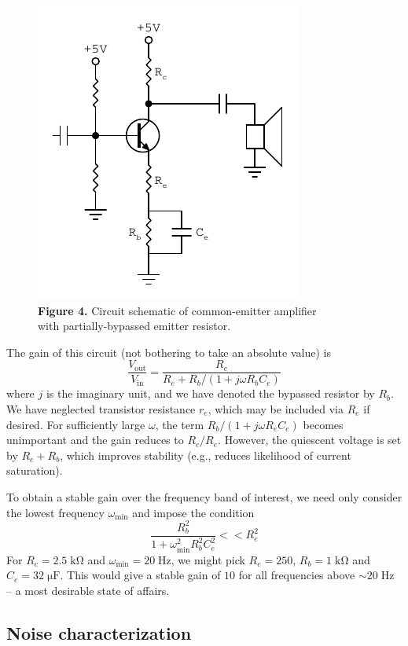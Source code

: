 \documentclass[11pt]{article}
\newcommand {\mt}{\mathrm}
\newcommand {\unit}[1]{\; \mt{#1}}
\begin{document}
\begin{figure}[h]
    \centering
    \includegraphics[scale=1]{schematics/amplifier_bypass.pdf} \\
    \textbf{Figure 4.} Circuit schematic of common-emitter amplifier \\
    with partially-bypassed emitter resistor.
\end{figure}

The gain of this circuit (not bothering to take an absolute value) is
\[
  \frac{V_\mt{out}}{V_\mt{in}}
    = \frac{R_c} { R_e + R_b/(1+j\omega R_b C_e) }
\]
where $j$ is the imaginary unit, and we have denoted the bypassed resistor by
$R_b$.  We have neglected transistor resistance $r_e$, which may be included
via $R_e$ if desired.  For sufficiently large $\omega$, the
term $R_b/(1+j\omega R_e C_e)$ becomes unimportant and the gain reduces to
$R_c / R_e$.  However, the quiescent voltage is set by $R_e + R_b$, which
improves stability (e.g., reduces likelihood of current saturation).

To obtain a stable gain over the frequency band of interest, we need only
consider the lowest frequency $\omega_{\mt{min}}$ and impose the condition
\[
  \frac{R_b^2}{1 + \omega_{\mt{min}}^2 R_b^2 C_e^2} << R_e^2
\]
For $R_c = 2.5 \unit{k\Omega}$ and $\omega_{\mt{min}} = 20 \unit{Hz}$, we might
pick $R_e = 250$, $R_b = 1 \unit{k\Omega}$ and $C_e = 32 \unit{\mu F}$.  This
would give a stable gain of $10$ for all frequencies above $\sim 20 \unit{Hz}$
-- a most desirable state of affairs.

\subsection{Noise characterization}
\end{document}

